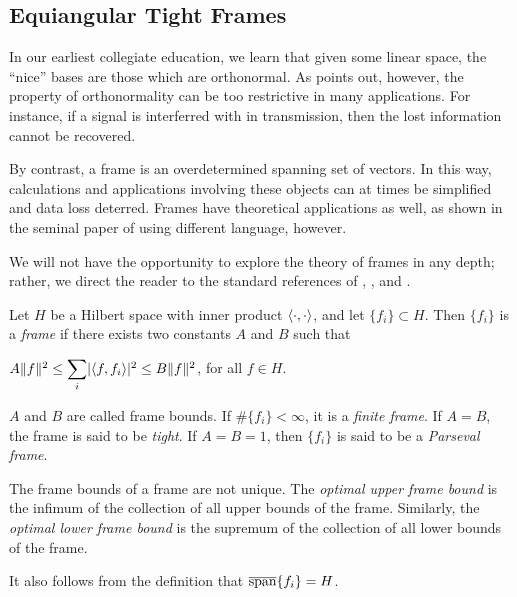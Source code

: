 \documentclass[../../../main]{subfiles}
\begin{document}
\subsection{Equiangular Tight Frames}

In our earliest collegiate education, we learn that given some linear space, the ``nice'' bases are those which are orthonormal. As \cite{undergrad-frames} points out, however, the property of orthonormality can be too restrictive in many applications. For instance, if a signal is interferred with in transmission, then the lost information cannot be recovered. 

By contrast, a frame is an overdetermined  spanning set of vectors. In this way, calculations and applications involving these objects can at times be simplified and data loss deterred. Frames have theoretical applications as well, as shown in the seminal paper of \cite{paley-wiener} using different language, however.

We will not have the opportunity to explore the theory of frames in any depth; rather, we direct the reader to the standard references of \cite{intro-to-frame-theory}, \cite{waldron-tight-frames}, and \cite{young-nonharmonic-frames}.

\begin{defin}
 Let $H$ be a Hilbert space  with inner product $\langle\cdot,\cdot\rangle$, and let $\{f_i\} \subset H$. Then $\{f_i\}$ is a {\it frame} if there exists two constants $A$ and $B$ such that
 \begin{defenum}
  \item $A\Vert f \Vert^2 \leq \ssum_i \abs{\sharps{f,f_i}}^2 \leq B\Vert f \Vert^2$, for all $f \in H$.
 \end{defenum}
 $A$ and $B$ are called frame bounds. If $\#\{f_i\} < \infty$, it is a {\it finite frame}. If $A=B$, the frame is said to be {\it tight}. If $A=B=1$, then $\{f_i\}$ is said to be a {\it Parseval frame}.
\end{defin}

The frame bounds of a frame are not unique. The {\it optimal upper frame bound} is the infimum of the collection of all upper bounds of the frame. Similarly, the {\it optimal lower frame bound} is the supremum of the collection of all lower bounds of the frame.

It also follows from the definition that $\overline{\text{span}}\{f_i\}=H$.
\end{document}
